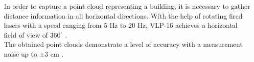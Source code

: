 In order to capture a point cloud representing a building, it is necessary to gather distance information in all horizontal directions. With the help of rotating fired lasers with a speed ranging from $5$ Hz to $20$ Hz, VLP-16 achieves a horizontal field of view of $360 ^{\circ}$ \cite{VLP-16}.\\

The obtained point clouds demonstrate a level of accuracy with a measurement noise up to $\pm 3$ cm \cite{LiDAR_review}.





